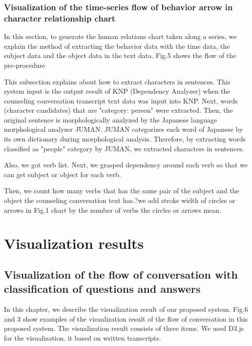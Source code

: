 \documentclass[review]{elsarticle}
\begin{document}
\subsubsection{Visualization of the time-series flow of behavior arrow in character relationship chart}

  In this section, to generate the human relations chart taken along a series, we explain the method of extracting the behavior data with the time data, the subject data and the object data in the text data. Fig.5 shows the flow of the pre-procedure

  This subsection explains about how to extract characters in sentences. This system input is the output result of KNP\cite{kawahara2006fully} (Dependency Analyzer) when the counseling conversation transcript text data was input into KNP. Next, words (character candidates) that are "category: person" were extracted. Then, the original sentence is morphologically analyzed by the Japanese language morphological analyzer JUMAN\cite{juman}. JUMAN categorizes each word of Japanese by its own dictionary during morphological analysis. Therefore, by extracting words classified as "people" category by JUMAN, we extracted characters in sentences. 

  Also, we got verb list. Next, we grasped dependency around each verb so that we can get subject or object for each verb. 

  Then, we count how many verbs that has the same pair of the subject and the object the counseling conversation text has.?we add stroke width of circles or arrows in Fig.1 chart by the number of verbs the circles or arrows mean.




\section{Visualization results}

\subsection{Visualization of the flow of conversation with classification of questions and answers}

  In this chapter, we describe the visualization result of our proposed system. Fig.6 and 3 show examples of the visualization result of the flow of conversation in this proposed system. The visualization result consists of three items.  We used D3.js\cite{vand3} for the visualization. it based on written transcripts.
\end{document}
